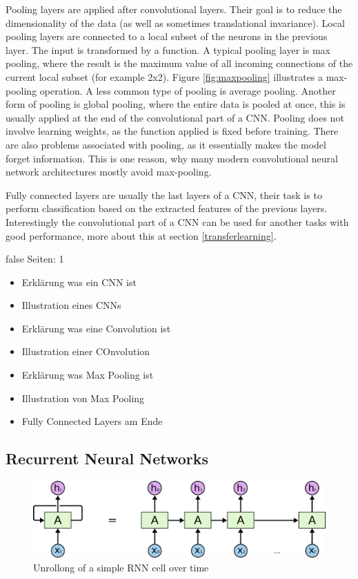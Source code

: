 \documentclass[draft,final,oneside]{vutinfth} %
\begin{document}
Pooling layers are applied after convolutional layers. Their goal is to reduce the dimensionality of the data (as well as sometimes translational invariance). Local pooling layers are connected to a local subset of the neurons in the previous layer. The input is transformed by a function. A typical pooling layer is max pooling, where the result is the maximum value of all incoming connections of the current local subset (for example 2x2). Figure \ref{fig:maxpooling} illustrates a max-pooling operation. A less common type of pooling is average pooling. Another form of pooling is global pooling, where the entire data is pooled at once, this is usually applied at the end of the convolutional part of a CNN. Pooling does not involve learning weights, as the function applied is fixed before training. There are also problems associated with pooling, as it essentially makes the model forget information. This is one reason, why many modern convolutional neural network architectures mostly avoid max-pooling. \cite{resnet}

Fully connected layers are usually the last layers of a CNN, their task is to perform classification based on the extracted features of the previous layers. Interestingly the convolutional part of a CNN can be used for another tasks with good performance, more about this at section \ref{transferlearning}.

\if false
Seiten: 1
\begin{itemize}

\item Erklärung was ein CNN ist
\item Illustration eines CNNs
\item Erklärung was eine Convolution ist
\item Illustration einer COnvolution
\item Erklärung was Max Pooling ist
\item Illustration von Max Pooling
\item Fully Connected Layers am Ende


\end{itemize}
\fi

\subsection{Recurrent Neural Networks} \label{lstmbackground}

\begin{figure}[ht]
	\centering
  	\includegraphics[width=1.0\textwidth]{graphics/rnn.png}
	\caption{Unrollong of a simple RNN cell over time \cite{colahlstm}}
	\label{fig:rnn}
\end{figure}
\end{document}
